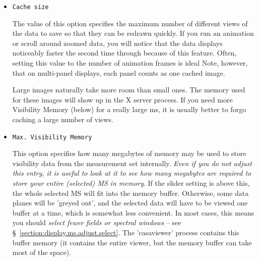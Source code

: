 \begin{itemize}

\item {\tt Cache size}

The value of this option specifies the maximum
number of different views of the data to save so that they
can be redrawn quickly.  If you run an animation or scroll around
zoomed data, you will notice that the data displays noticeably faster
the second time through because of this feature.  Often, setting this
value to the number of animation frames is ideal  Note, however, that
on multi-panel displays, each panel counts as one cached image.

Large images naturally take more room than small ones.  The memory used
for these images will show up in the X server process.  If you need more
Visibility Memory (below) for a really large ms, it is usually better to
forgo caching a large number of views.

\item {\tt Max. Visibility Memory}

This option specifies how many megabytes of memory may be used to store
visibility data from the measurement set internally.  {\it Even if you do
not adjust this entry, it is useful to look at it to see how many megabytes
are required to store your entire (selected) MS in memory}.  If the slider
setting is above this, the whole selected MS will fit into the memory
buffer.  Otherwise, some data planes will be 'greyed out', and the selected 
data will have to be viewed one buffer at a time, which is somewhat less 
convenient. In most cases, this means you should {\it select fewer fields
or spectral windows} -- see \S~\ref{section:display.ms.adjust.select}.
The 'casaviewer' process contains this buffer memory (it contains the entire
viewer, but the memory buffer can take most of the space).

\end{itemize}

